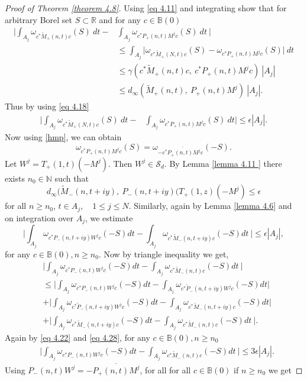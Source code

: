 \documentclass[10pt,a4paper]{amsart}
\newcommand{\N}{\mathbb{N}}
\newcommand{\R}{\mathbb{R}}
\begin{document}
\begin{proof}[Proof of Theorem \ref{theorem 4.8}]
Using \eqref{eq 4.11} and integrating show that for arbitrary Borel set $S \subset \R$ and for any $c \in \mathbb B(0)$
  \begin{align*}  \Big | \int_{A_j} \omega_{c^* \tilde M_+(n,t)c} (S) \ dt -  & \int_{A_j} \omega_{c^*  P_+(n,t)M^jc}(S) \ dt\  \Big | \\   & \leq  \int_{A_j}  \Big | \omega_{c^* \tilde M_+(N,t)c} (S) - \omega_{c^*  P_+(n,t)M^jc}(S) \Big|\ dt \\ & \leq  \gamma ( c^* \tilde M_+(n,t)c, \ c^*P_+(n,t) M^jc ) \ |A_j| \\ & \leq d_{\infty}(\tilde M_+(n,t), \ P_+(n,t) M^j) \ |A_j|. \end{align*}
  Thus by using \eqref {eq 4.18}
   \begin{align} \label{ineq 1}  \Big | \int_{A_j} \omega_{c^* \tilde M_+(N,t)c} (S) \ dt -  & \int_{A_j} \omega_{c^*  P_+(n,t)M^jc}(S) \ dt \Big |  \leq \epsilon |A_j|. \end{align}
 Now using   \eqref{hmp}, we can obtain 
 \begin{equation} \label{omega} \omega_{c^*P_+(n,t)M^jc}(S) = \omega_{- \overline{c^*P_+(n,t)M^jc}}(-S).\end{equation}
 Let $W^j = T_+(1, t)(-M^j).$ Then $W^j \in \mathcal S_d .$  
By Lemma \ref{lemma 4.11 } there exists $n_0 \in \N $ such that
\begin{equation} \label{eq 4.26}  d_{\infty}(\tilde M_-(n,t+iy), \ P_-(n,t+iy)( T_+(1,z)(- M^j ) \leq \epsilon \end{equation}
 for all $ n\geq n_0$, $t \in A_j,\quad  1\leq j \leq N .$
Similarly, again by Lemma \ref{lemma 4.6} and on integration over $A_j$, we estimate
 \begin{equation} \label{eq 4.28} \Big | \int_{A_j} \omega_{c^* P_-(n, t+iy) W^jc}(-S) dt - \int_{A_j} \omega_{c^* \tilde M_-(n, t+iy)c}(-S) dt\  \Big | \leq \epsilon |A_j| ,\end{equation} for any $c \in \mathbb B(0), n\geq n_0.$
Now by triangle inequality we get,
\begin{align*}   &\Big | \int_{A_j} \omega_{c^* P_-(n, t) W^jc}(-S) dt -  \int_{A_j} \omega_{c^* \tilde M_-(n, t)c}(-S) dt\  \Big | 
\\ & \leq  \Big | \int_{A_j} \omega_{c^* P_-(n,t) W^j c}(-S) dt - \int_{A_j} \omega_{c^* \tilde P_-(n, t+iy)W^jc}(-S) dt \Big | \\  & +\Big |\int_{A_j} \omega_{c^* \tilde P_-(n, t+iy)W^jc}(-S) dt - \int_{A_j} \omega_{c^*  \tilde M_-(n, t+iy)c}(-S) dt  \Big | \\ & + \Big |
\int_{A_j} \omega_{c^*  \tilde M_-(n, t+iy)c}(-S) dt  -
\int_{A_j} \omega_{c^* \tilde M_-(n, t)c}(-S) dt\  \Big | .\end{align*} 
Again by  \eqref{eq 4.22}   and \eqref{eq 4.28}, for any $c \in \mathbb B(0),  n\geq n_0$
\begin{align} \label{ineq2}  &\Big | \int_{A_j} \omega_{c^* P_-(n,t) W^j c}(-S) dt -  \int_{A_j} \omega_{c^* \tilde M_-(n,t)c}(-S) dt\  \Big | \leq 3\epsilon |A_j| . 
\end{align} 
  Using $ P_-(n,t) W^j = - \overline {P_+(n,t)M^j}$, for all for all $c\in \mathbb B(0)$ if $n\geq n_0 $ we get
 

\end{proof}
\end{document}

